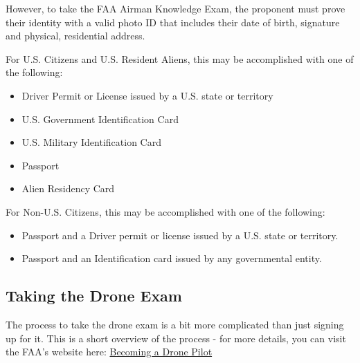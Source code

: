 \documentclass[
  12pt,
]{book}
\providecommand{\tightlist}{%
  \setlength{\itemsep}{0pt}\setlength{\parskip}{0pt}}
\begin{document}
However, to take the FAA Airman Knowledge Exam, the proponent must prove their identity with a valid photo ID that includes their date of birth, signature and physical, residential address.

For U.S. Citizens and U.S. Resident Aliens, this may be accomplished with one of the following:

\begin{itemize}
\tightlist
\item
  Driver Permit or License issued by a U.S. state or territory
\item
  U.S. Government Identification Card
\item
  U.S. Military Identification Card
\item
  Passport
\item
  Alien Residency Card
\end{itemize}

For Non-U.S. Citizens, this may be accomplished with one of the following:

\begin{itemize}
\tightlist
\item
  Passport and a Driver permit or license issued by a U.S. state or territory.
\item
  Passport and an Identification card issued by any governmental entity.
\end{itemize}

\hypertarget{taking-the-drone-exam}{%
\subsection{Taking the Drone Exam}\label{taking-the-drone-exam}}

The process to take the drone exam is a bit more complicated than just signing up for it. This is a short overview of the process - for more details, you can visit the FAA's website here: \href{https://www.faa.gov/uas/commercial_operators/become_a_drone_pilot/}{Becoming a Drone Pilot}
\end{document}
